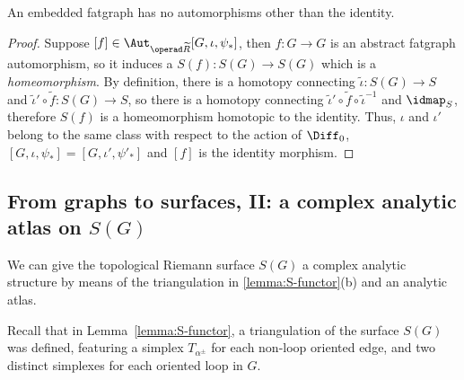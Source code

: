 \begin{lemma}
  \label{lemma:erg-no-aut}
  An embedded fatgraph has no automorphisms other than the identity.
\end{lemma}
\begin{proof}
  Suppose $[f] \in \Aut_{\ERG}[G, \iota, \psi_*]$, then $f:G\to G$ is an abstract
  fatgraph automorphism, so it induces a $S(f): S(G) \to S(G)$
  which is a \emph{homeomorphism}.  By definition, there is a homotopy
  connecting ${\tilde \iota}: S(G) \to S$ and ${\tilde \iota'} \circ {\tilde f}:
  S(G)\to S$, so there is a homotopy connecting ${\tilde \iota'} \circ {\tilde f}
  \circ {\tilde \iota}^{-1}$ and $\idmap_S$, therefore $S(f)$ is a
  homeomorphism homotopic to the identity.  Thus, $\iota$ and $\iota'$ belong
  to the same class with respect to the action of $\Diff_0$, $[G, \iota,
  \psi_*] = [G, \iota', \psi'_*]$ and $[f]$ is the identity morphism.
\end{proof}


\subsection[From graphs to surfaces, II][A complex analytic atlas on $S(G)$]
{From graphs to surfaces, II: a complex analytic atlas on $S(G)$}
\label{sec:atlas}

We can give the topological Riemann surface $S(G)$ a complex analytic
structure by means of the triangulation in \ref{lemma:S-functor}(b)
and an analytic atlas.

Recall that in Lemma~\ref{lemma:S-functor}, a triangulation of the surface
$S(G)$ was defined, featuring a simplex $T_{\alpha^\pm}$ for each
non-loop oriented edge, and two distinct simplexes for each oriented
loop in $G$.

